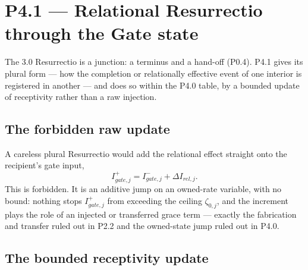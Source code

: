 \documentclass[11pt,a4paper]{article}
\def\mathrm#1{#1}%
\theoremstyle{definition}
\theoremstyle{plain}
\theoremstyle{remark}
\begin{document}
\section{P4.1 --- Relational Resurrectio through the Gate state}

The 3.0 Resurrectio is a junction: a terminus and a hand-off (P0.4). P4.1 gives its plural
form --- how the completion or relationally effective event of one interior is registered in
another --- and does so within the P4.0 table, by a bounded update of receptivity rather than
a raw injection.

\subsection{The forbidden raw update}

A careless plural Resurrectio would add the relational effect straight onto the recipient's
gate input,
\[
I_{\mathrm{gate},j}^{+}
=
I_{\mathrm{gate},j}^{-}
+
\Delta I_{\mathrm{rel},j}.
\]
This is forbidden. It is an additive jump on an owned-rate variable, with no bound: nothing
stops \(I_{\mathrm{gate},j}^{+}\) from exceeding the ceiling \(\zeta_{0,j}\), and the
increment plays the role of an injected or transferred grace term --- exactly the
fabrication and transfer ruled out in P2.2 and the owned-state jump ruled out in P4.0.

\subsection{The bounded receptivity update}
\end{document}
